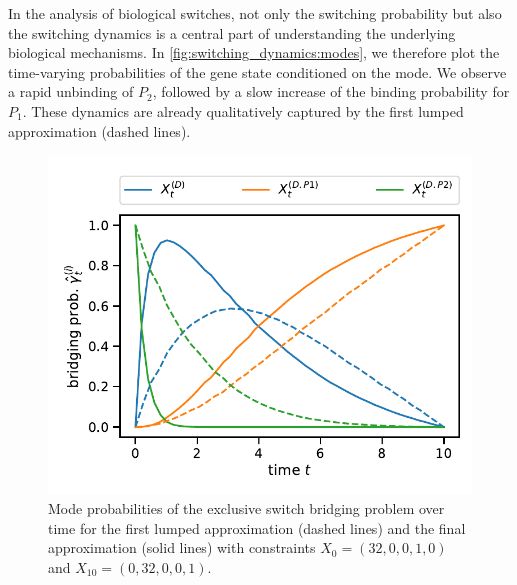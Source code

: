 In the analysis of biological switches, not only the switching probability
but also the switching dynamics is a central part of understanding
the underlying biological mechanisms.
In \autoref{fig:switching_dynamics:modes}, we therefore plot the
time-varying probabilities of the gene state conditioned on the mode.
We observe a rapid unbinding of $P_2$, followed by a slow increase of
the binding probability for $P_1$.
These dynamics are already qualitatively captured by the first lumped
approximation (dashed lines).
\begin{figure}
  \centering
  \includegraphics[scale=.6]{gfx/excl_switch_modeprobs.pdf}
  \caption[Mode probabilities of the exclusive switch bridging
  problem]{Mode probabilities of the exclusive switch bridging
    problem over time for the first lumped approximation (dashed lines)
    and the final approximation (solid lines) with constraints
    $X_0=(32, 0, 0, 1, 0)$ and $X_{10}=(0,32,0,0,1)$.
  \label{fig:switching_dynamics:modes}}
\end{figure}
